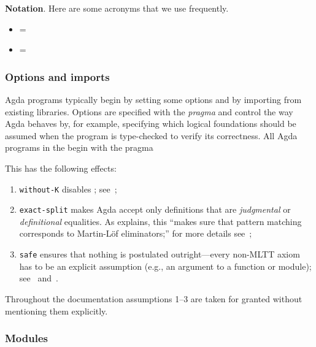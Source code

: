 
\noindent \textbf{Notation}. Here are some acronyms that we use frequently.

\begin{itemize}
\tightlist
\item \mhe = \MHE
\item \mltt = \MLTT
\end{itemize}

\subsubsection{Options and imports}\label{options-and-imports}
Agda programs typically begin by setting some options and by importing from existing libraries.
Options are specified with the  \emph{pragma} and control the way Agda behaves by, for example, specifying which logical foundations should be assumed when the program is type-checked to verify its correctness.  
All Agda programs in the \ualib begin with the pragma
\ccpad
\begin{code}[number=code:options]
\>[0]\AgdaSymbol{\{-\#}\AgdaSpace{}%
\AgdaSpace{}%
\AgdaSpace{}%
\AgdaSpace{}%
\AgdaSpace{}%
\AgdaSymbol{\#-\}}\<%
\end{code}
\ccpad
This has the following effects:
\begin{enumerate}
\item
  \texttt{without-K} disables \axiomk; see~\cite{agdaref-axiomk};
\item
  \texttt{exact-split} makes Agda accept only definitions that are \emph{judgmental} or \emph{definitional} equalities. As \escardo explains, this ``makes sure that pattern matching corresponds to Martin-Löf eliminators;'' for more details see~\cite{agdatools-patternmatching};
\item
  \texttt{safe} ensures that nothing is postulated outright---every non-MLTT axiom has to be an explicit assumption (e.g., an argument to a function or module); see~\cite{agdaref-safeagda} and~\cite{agdatools-patternmatching}.
\end{enumerate}
Throughout the \ualib documentation assumptions 1--3 are taken for granted without mentioning them explicitly.




\subsubsection{Modules}\label{modules}

